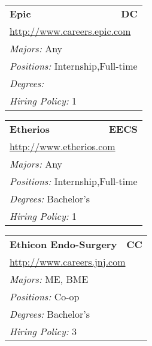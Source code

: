 \documentclass[twoside]{article}
\begin{document}
\begin{center}
\begin{multicols}{3}
\begin{FlushLeft}
\begin{minipage}{\columnwidth}
\end{minipage}
 
\begin{minipage}{\columnwidth}\begin{tabularx}{.95\columnwidth}{Xr}
                 {\Large\bf Epic} & {\Large\bf DC}\\
    \multicolumn{2}{p{.95\columnwidth}}{\url{http://www.careers.epic.com}}\\
    \multicolumn{2}{p{.95\columnwidth}}{\emph{Majors:} Any}\\
    \multicolumn{2}{p{.95\columnwidth}}{\emph{Positions:} Internship,Full-time}\\
    \multicolumn{2}{p{.95\columnwidth}}{\emph{Degrees:} }\\
    \multicolumn{2}{p{.95\columnwidth}}{\emph{Hiring Policy:} 1}\\
    \end{tabularx}
    
\end{minipage}
 
\begin{minipage}{\columnwidth}\begin{tabularx}{.95\columnwidth}{Xr}
                 {\Large\bf Etherios} & {\Large\bf EECS}\\
    \multicolumn{2}{p{.95\columnwidth}}{\url{http://www.etherios.com}}\\
    \multicolumn{2}{p{.95\columnwidth}}{\emph{Majors:} Any}\\
    \multicolumn{2}{p{.95\columnwidth}}{\emph{Positions:} Internship,Full-time}\\
    \multicolumn{2}{p{.95\columnwidth}}{\emph{Degrees:} Bachelor's}\\
    \multicolumn{2}{p{.95\columnwidth}}{\emph{Hiring Policy:} 1}\\
    \end{tabularx}
    
\end{minipage}
 
\begin{minipage}{\columnwidth}\begin{tabularx}{.95\columnwidth}{Xr}
                 {\Large\bf Ethicon Endo-Surgery} & {\Large\bf CC}\\
    \multicolumn{2}{p{.95\columnwidth}}{\url{http://www.careers.jnj.com}}\\
    \multicolumn{2}{p{.95\columnwidth}}{\emph{Majors:} ME, BME}\\
    \multicolumn{2}{p{.95\columnwidth}}{\emph{Positions:} Co-op}\\
    \multicolumn{2}{p{.95\columnwidth}}{\emph{Degrees:} Bachelor's}\\
    \multicolumn{2}{p{.95\columnwidth}}{\emph{Hiring Policy:} 3}\\
    \end{tabularx}
    

\end{minipage}
\end{FlushLeft}
\end{multicols}
\end{center}
\end{document}
